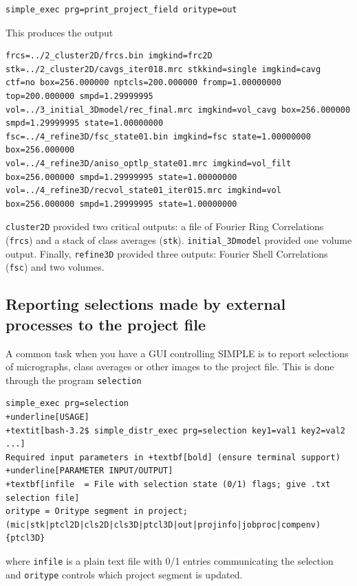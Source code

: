 \documentclass[a4paper,11pt]{article}
\newcommand{\prgname}[1]{\textcolor{NavyBlue}{\texttt{#1}}}
\begin{document}
\begin{Verbatim}[commandchars=+\[\],fontsize=\small,breaklines=true]
simple_exec prg=print_project_field oritype=out
\end{Verbatim}

\noindent{}This produces the output

\begin{Verbatim}[commandchars=+\[\],fontsize=\small,breaklines=true]
frcs=../2_cluster2D/frcs.bin imgkind=frc2D
stk=../2_cluster2D/cavgs_iter018.mrc stkkind=single imgkind=cavg ctf=no box=256.000000 nptcls=200.000000 fromp=1.00000000 top=200.000000 smpd=1.29999995
vol=../3_initial_3Dmodel/rec_final.mrc imgkind=vol_cavg box=256.000000 smpd=1.29999995 state=1.00000000
fsc=../4_refine3D/fsc_state01.bin imgkind=fsc state=1.00000000 box=256.000000
vol=../4_refine3D/aniso_optlp_state01.mrc imgkind=vol_filt box=256.000000 smpd=1.29999995 state=1.00000000
vol=../4_refine3D/recvol_state01_iter015.mrc imgkind=vol box=256.000000 smpd=1.29999995 state=1.00000000
\end{Verbatim}

\noindent{}\prgname{cluster2D} provided two critical outputs: a file of Fourier Ring Correlations (\texttt{frcs}) and a stack of class averages (\texttt{stk}). \prgname{initial\_3Dmodel} provided one volume output. Finally, \prgname{refine3D} provided three outputs: Fourier Shell Correlations (\texttt{fsc}) and two volumes.

\subsection{Reporting selections made by external processes to the project file}

A common task when you have a GUI controlling SIMPLE is to report selections of micrographs, class averages or other images to the project file. This is done through the program \texttt{selection}
\begin{Verbatim}[commandchars=+\[\],fontsize=\small,breaklines=true]
simple_exec prg=selection
+underline[USAGE]
+textit[bash-3.2$ simple_distr_exec prg=selection key1=val1 key2=val2 ...]
Required input parameters in +textbf[bold] (ensure terminal support)
+underline[PARAMETER INPUT/OUTPUT]
+textbf[infile  = File with selection state (0/1) flags; give .txt selection file]
oritype = Oritype segment in project; (mic|stk|ptcl2D|cls2D|cls3D|ptcl3D|out|projinfo|jobproc|compenv){ptcl3D}
\end{Verbatim}

where \texttt{infile} is a plain text file with 0/1 entries communicating the selection and \texttt{oritype} controls which project segment is updated. 
\end{document}

